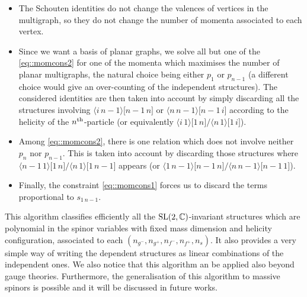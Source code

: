 \documentclass[aps,prd,nofootinbib,twocolumn,10pt]{revtex4-2}
\newcommand{\agl}[2]{\langle#1\, #2 \rangle}
\newcommand{\sqr}[2]{\lbrack #1\, #2 \rbrack}
\begin{document}
\begin{itemize}
    \item The Schouten identities do not change the valences of vertices in the multigraph, so they do not change the number of momenta associated to each vertex.
    \item Since we want a basis of planar graphs, we solve all but one of the \eqref{eq::momcons2} for one of the momenta which maximises the number of planar multigraphs, the natural choice being either $p_1$ or $p_{n-1}$ (a different choice would give an over-counting of the independent structures). The considered identities are then taken into account by simply discarding all the structures involving $\agl{i}{n-1} \sqr{n-1}{n}$ or $\agl{n}{n-1} \sqr{n-1}{i}$ according to the helicity of the $n^{\rm th}$-particle (or equivalently $\agl{i}{1} \sqr{1}{n} \big/ \agl{n}{1} \sqr{1}{i}$).
    \item Among \eqref{eq::momcons2}, there is one relation which does not involve neither $p_n$ nor $p_{n-1}$. This is taken into account by discarding those structures where $\agl{n-1}{1} \sqr{1}{n} \big/ \agl{n}{1} \sqr{1}{n-1}$ appears (or $\agl{1}{n-1} \sqr{n-1}{n} \big/ \agl{n}{n-1} \sqr{n-1}{1}$).
    \item Finally, the constraint \eqref{eq::momcons1} forces us to discard the terms proportional to $s_{1\, n-1}$.
\end{itemize}
This algorithm classifies efficiently all the ${\rm SL}(2,\mathbb{C})$-invariant structures which are polynomial in the spinor variables with fixed mass dimension and helicity configuration, associated to each $(n_{g^-},n_{g^+},n_{f^-},n_{f^+},n_s)$. It also provides a very simple way of writing the dependent structures as linear combinations of the independent ones. We also notice that this algorithm an be applied also beyond gauge theories. Furthermore, the generalisation of this algorithm to massive spinors is possible and it will be discussed in future works.
\end{document}
